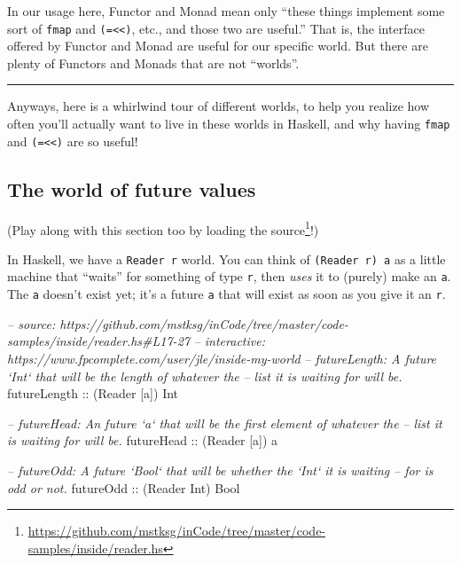 \documentclass[]{article}
\newenvironment{Shaded}{\begin{snugshade}}{\end{snugshade}}
\newcommand{\CommentTok}[1]{\textcolor[rgb]{0.56,0.35,0.01}{\textit{#1}}}
\newcommand{\DataTypeTok}[1]{\textcolor[rgb]{0.13,0.29,0.53}{#1}}
\newcommand{\NormalTok}[1]{#1}
\newcommand{\OtherTok}[1]{\textcolor[rgb]{0.56,0.35,0.01}{#1}}
\renewcommand{\href}[2]{#2\footnote{\url{#1}}}
\begin{document}
In our usage here, Functor and Monad mean only ``these things implement some
sort of \texttt{fmap} and \texttt{(=\textless{}\textless{})}, etc., and those
two are useful.'' That is, the interface offered by Functor and Monad are useful
for our specific world. But there are plenty of Functors and Monads that are not
``worlds''.

\begin{center}\rule{0.5\linewidth}{\linethickness}\end{center}

Anyways, here is a whirlwind tour of different worlds, to help you realize how
often you'll actually want to live in these worlds in Haskell, and why having
\texttt{fmap} and \texttt{(=\textless{}\textless{})} are so useful!

\hypertarget{the-world-of-future-values}{%
\subsection{The world of future values}\label{the-world-of-future-values}}

(Play along with this section too by
\href{https://github.com/mstksg/inCode/tree/master/code-samples/inside/reader.hs}{loading
the source}!)

In Haskell, we have a \texttt{Reader\ r} world. You can think of
\texttt{(Reader\ r)\ a} as a little machine that ``waits'' for something of type
\texttt{r}, then \emph{uses} it to (purely) make an \texttt{a}. The \texttt{a}
doesn't exist yet; it's a future \texttt{a} that will exist as soon as you give
it an \texttt{r}.

\begin{Shaded}
\begin{Highlighting}[]
\CommentTok{-- source: https://github.com/mstksg/inCode/tree/master/code-samples/inside/reader.hs#L17-27}
\CommentTok{-- interactive: https://www.fpcomplete.com/user/jle/inside-my-world}
\CommentTok{-- futureLength: A future `Int` that will be the length of whatever the}
\CommentTok{--      list it is waiting for will be.}
\OtherTok{futureLength ::}\NormalTok{ (}\DataTypeTok{Reader}\NormalTok{ [a]) }\DataTypeTok{Int}

\CommentTok{-- futureHead: An future `a` that will be the first element of whatever the}
\CommentTok{--      list it is waiting for will be.}
\OtherTok{futureHead   ::}\NormalTok{ (}\DataTypeTok{Reader}\NormalTok{ [a]) a}

\CommentTok{-- futureOdd: A future `Bool` that will be whether the `Int` it is waiting}
\CommentTok{--      for is odd or not.}
\OtherTok{futureOdd    ::}\NormalTok{ (}\DataTypeTok{Reader} \DataTypeTok{Int}\NormalTok{) }\DataTypeTok{Bool}
\end{Highlighting}
\end{Shaded}
\end{document}
